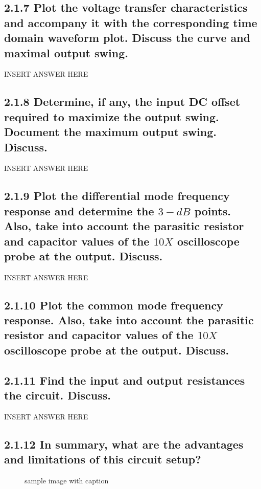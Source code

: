\documentclass[12pt]{article}
\begin{document}
\subsection*{2.1.7 Plot the voltage transfer characteristics and accompany it with the corresponding time domain waveform plot. Discuss the curve and maximal output swing.}

INSERT ANSWER HERE

\subsection*{2.1.8 Determine, if any, the input DC offset required to maximize the output swing. Document the maximum output swing. Discuss.}

INSERT ANSWER HERE

\subsection*{2.1.9 Plot the differential mode frequency response and determine the $3-dB$ points. Also, take into account the parasitic resistor and capacitor values of the $10X$ oscilloscope probe at the output. Discuss.  }

INSERT ANSWER HERE

\subsection*{2.1.10 Plot the common mode frequency response. Also, take into account the parasitic resistor and capacitor values of the $10X$ oscilloscope probe at the output. Discuss. }

\subsection*{2.1.11 Find the input and output resistances the circuit. Discuss. }

INSERT ANSWER HERE

\subsection*{2.1.12 In summary, what are the advantages and limitations of this circuit setup?}

\begin{figure}[H]
  \centering
    \qquad
    \qquad
    \caption{sample image with caption}%
    \label{fig:testing}%
\end{figure}
\end{document}
